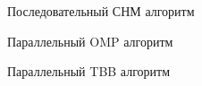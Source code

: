 \documentclass{report}
\begin{document}
\begin{figure}[H]
\caption{Последовательный СНМ алгоритм}
\end{figure}
\begin{figure}[H]
\caption{Параллельный OMP алгоритм}
\end{figure}
\begin{figure}[H]
\caption{Параллельный TBB алгоритм}
\end{figure}
\end{document}
